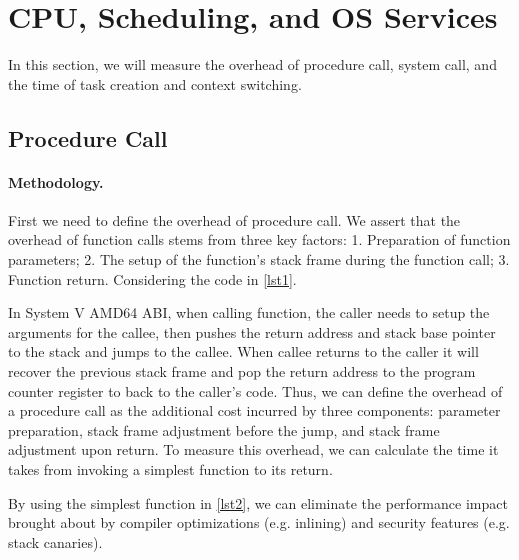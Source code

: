 \section{CPU, Scheduling, and OS Services}
In this section, we will measure the overhead of procedure call, system call, and the time of task creation and context switching.

\subsection{Procedure Call}
\paragraph{Methodology.} First we need to define the overhead of procedure call. We assert that the overhead of function calls stems from three key factors: 1. Preparation of function parameters; 2. The setup of the function's stack frame during the function call; 3. Function return. Considering the code in \ref{lst1}. 

In System V AMD64 ABI, when calling function, the caller needs to setup the arguments for the callee, then pushes the return address and stack base pointer to the stack and jumps to the callee. When callee returns to the caller it will recover the previous stack frame and pop the return address to the program counter register to back to the caller's code. Thus, we can define the overhead of a procedure call as the additional cost incurred by three components: parameter preparation, stack frame adjustment before the jump, and stack frame adjustment upon return. To measure this overhead, we can calculate the time it takes from invoking a simplest function to its return.

By using the simplest function in \ref{lst2}, we can eliminate the performance impact brought about by compiler optimizations (e.g. inlining) and security features (e.g. stack canaries).

